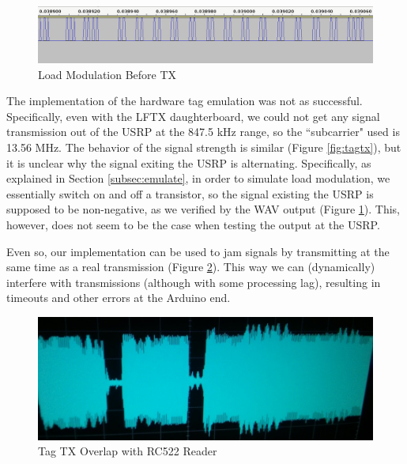 \documentclass[fleqn,10pt]{SelfArx} %
\begin{document}
\begin{figure}[tp]
  \includegraphics[width=\linewidth]{img/load}
  \caption{Load Modulation Before TX}
  \label{fig:load}
\end{figure}


The implementation of the hardware tag emulation was not as successful. Specifically, even with the LFTX daughterboard, we could not get any signal transmission out of the USRP at the 847.5 kHz range, so the ``subcarrier" used is 13.56 MHz. The behavior of the signal strength is similar (Figure \ref{fig:tagtx}), but it is unclear why the signal exiting the USRP is alternating. Specifically, as explained in Section \ref{subsec:emulate}, in order to simulate load modulation, we essentially switch on and off a transistor, so the signal existing the USRP is supposed to be non-negative, as we verified by the WAV output (Figure \ref{fig:load}). This, however, does not seem to be the case when testing the output at the USRP.

Even so, our implementation can be used to jam signals by transmitting at the same time as a real transmission (Figure \ref{fig:overlap}). This way we can (dynamically) interfere with transmissions (although with some processing lag), resulting in timeouts and other errors at the Arduino end.

\begin{figure}[tp]
  \includegraphics[width=\linewidth]{img/overlap}
  \caption{Tag TX Overlap with RC522 Reader}
  \label{fig:overlap}
\end{figure}

\end{document}
